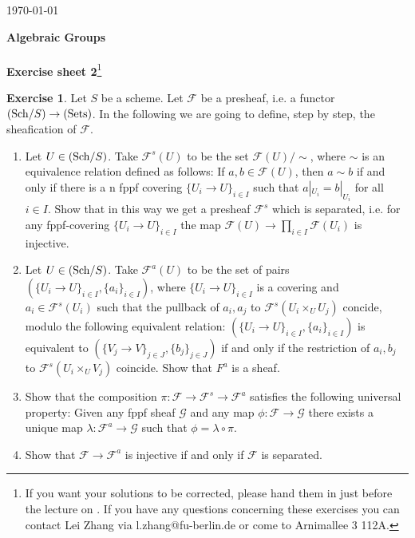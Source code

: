 \documentclass[12pt]{amsart}
\theoremstyle{plain}
\theoremstyle{definition}
\newtheorem{ex}{Exercise}
\numberwithin{Aufgabe}{section}
\newcommand{\sF}{{\mathcal F}}
\newcommand{\sG}{{\mathcal G}}
\begin{document}
\setdatetoday
\addtocounter{datenumber}{5}
\setdatebynumber{\thedatenumber}

\begin{flushright}\today
\end{flushright}
\begin{center}
 {\bf \Huge
Algebraic Groups}\\  
\vspace{0.5 cm}{\Large Dr. Lei Zhang}\\  
\vspace{0.7 cm}
{\bf\large Exercise sheet {2}}\footnote{ If you want your solutions to be corrected, please hand them in just before the lecture on \datedate. If you have any questions concerning these exercises you can contact Lei Zhang via l.zhang@fu-berlin.de or come to Arnimallee 3  112A. }\\
\end{center}

\begin{ex} Let $S$ be a scheme. Let $\sF$ be a presheaf, i.e. a functor $({\rm Sch}/S)\to ({\rm Sets})$.  In the following we are going to define, step by step, the sheafication of $\sF$.
\begin{enumerate}
\item  Let $U\in(\text{\rm Sch}/S)$. Take $\sF^s(U)$ to be the set $\sF(U)/\sim$, where $\sim$ is an equivalence relation defined as follows: If $a,b\in \sF(U)$, then $a\sim b$ if and only if there is a n fppf covering $\{U_i\to U\}_{i\in I}$ such that $a|_{U_i}=b|_{U_i}$ for all $i\in I$. Show that in this way we get a presheaf $\sF^s$ which is separated, i.e. for any fppf-covering $\{U_i\to U\}_{i\in I}$ the map $\sF(U)\to\prod_{i\in I}\sF(U_i)$ is injective.
\item Let $U\in(\text{\rm Sch}/S)$. Take $\sF^a(U)$ to be the set of pairs $(\{U_i\to U\}_{i\in I},\{a_i\}_{i\in I})$, where $\{U_i\to U\}_{i\in I}$ is a covering and $a_i\in \sF^s(U_i)$ such that the pullback of $a_i,a_j$ to $\sF^s(U_i\times_UU_j)$ concide, modulo the following equivalent relation:
$(\{U_i\to U\}_{i\in I},\{a_i\}_{i\in I})$ is equivalent to $(\{V_j\to V\}_{j\in J},\{b_j\}_{j\in J})$ if and only if the restriction of $a_i, b_j$ to $\sF^s(U_i\times_UV_j)$ coincide. Show that $F^a$ is a sheaf.
\item Show that the composition $\pi:\sF\to\sF^s\to\sF^a$ satisfies the following universal property:
Given any fppf sheaf $\sG$ and any map $\phi: \sF\to \sG$ there exists a unique map $\lambda:\sF^a\to\sG$ such that $\phi=\lambda\circ \pi$.
\item Show that $\sF\to\sF^a$ is injective if and only if $\sF$ is separated.
\end{enumerate}
\end{ex}
\end{document}
